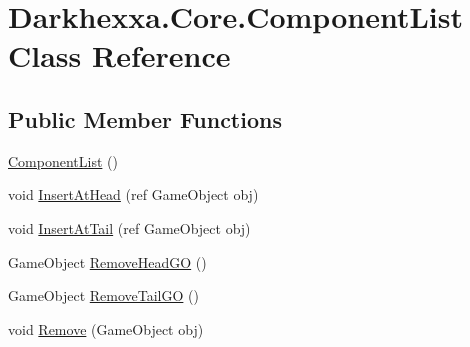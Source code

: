 \hypertarget{class_darkhexxa_1_1_core_1_1_component_list}{\section{Darkhexxa.\-Core.\-Component\-List Class Reference}
\label{class_darkhexxa_1_1_core_1_1_component_list}
}
\subsection*{Public Member Functions}
\begin{DoxyCompactItemize}
\item 
\hyperlink{class_darkhexxa_1_1_core_1_1_component_list_a0a28059a3c3d8ace2f0a789ebca9fe9a}{Component\-List} ()
\item 
void \hyperlink{class_darkhexxa_1_1_core_1_1_component_list_a38227b1b1c70988750d8b9faeb8109b9}{Insert\-At\-Head} (ref Game\-Object obj)
\item 
void \hyperlink{class_darkhexxa_1_1_core_1_1_component_list_a74ba809eec19ce341cc5d8c685eaea5b}{Insert\-At\-Tail} (ref Game\-Object obj)
\item 
Game\-Object \hyperlink{class_darkhexxa_1_1_core_1_1_component_list_a4baff132dc5c3de864a6b2e30a6a3212}{Remove\-Head\-G\-O} ()
\item 
Game\-Object \hyperlink{class_darkhexxa_1_1_core_1_1_component_list_a80ab55bc996e84f373fedceeb188f76e}{Remove\-Tail\-G\-O} ()
\item 
void \hyperlink{class_darkhexxa_1_1_core_1_1_component_list_a47f636d5d6dc55dabb3e832de5fe2569}{Remove} (Game\-Object obj)
\end{DoxyCompactItemize}
